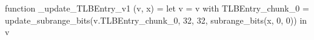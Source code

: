 function _update_TLBEntry_v1 (v, x) = let v = { v with TLBEntry_chunk_0 = update_subrange_bits(v.TLBEntry_chunk_0, 32, 32, subrange_bits(x, 0, 0)) } in
  v
